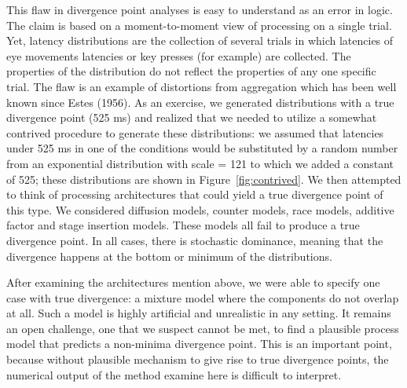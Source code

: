 \documentclass[man]{apa}%
\begin{document}
This flaw in divergence point analyses is easy to understand as an error in logic.  The claim is based on a moment-to-moment view of processing on a single trial.  Yet, latency distributions are the collection of several trials in which latencies of eye movements latencies or key presses (for example) are collected. The properties of the distribution do not reflect the properties of any one specific trial.  The flaw is an example of distortions from aggregation which has been well known since Estes (1956).   As an exercise, we generated distributions with a true divergence point (525 ms) and realized that we needed to utilize a somewhat contrived procedure to generate these distributions: we assumed that latencies under 525 ms in one of the conditions would be substituted by a random number from an exponential distribution with scale = 121 to which we added a constant of 525; these distributions are shown in Figure~\ref{fig:contrived}. We then attempted to think of processing architectures that could yield a true divergence point of this type.  We considered diffusion models, counter models, race models, additive factor and stage insertion models.  These models all fail to produce a true divergence point.  In all cases, there is stochastic dominance, meaning that the divergence happens at the bottom or minimum of the distributions.  

After examining the architectures mention above, we were able to specify one case with true divergence: a mixture model where the components do not overlap at all.  Such a model is highly artificial and unrealistic in any setting.  It remains an open challenge, one that we suspect cannot be met, to find a plausible process model that predicts a non-minima divergence point. This is an important point, because without plausible mechanism to give rise to true divergence points, the numerical output of the method examine here is difficult to interpret.
\end{document}
